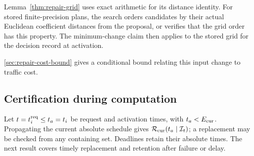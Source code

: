 \documentclass[preprint,12pt]{elsarticle}
\theoremstyle{definition}
\theoremstyle{plain}
\theoremstyle{definition}
\theoremstyle{plain}
\newcommand{\appref}[1]{\ref{#1}}
\begin{document}
Lemma~\ref{thm:repair-grid} uses exact arithmetic for its distance
identity. For stored finite-precision plans, the search orders candidates
by their actual Euclidean coefficient distances from the proposal, or
verifies that the grid order has this property. The minimum-change claim
then applies to the stored grid for the decision record at activation.

\appref{sec:repair-cost-bound} gives a conditional bound relating this
input change to traffic cost.

\subsection{Certification during computation}
\label{sec:planned-handover}

Let $t=t_i^{\rm req}\le t_a=t_i$ be request and activation times, with
$t_a<E_{\rm cur}$. Propagating the current absolute schedule gives
$\mathcal R_{\rm cur}(t_a\mid\mathcal I_t)$; a replacement may be checked
from any containing set. Deadlines retain their absolute times.
The next result covers timely replacement and retention after failure or delay.
\end{document}

